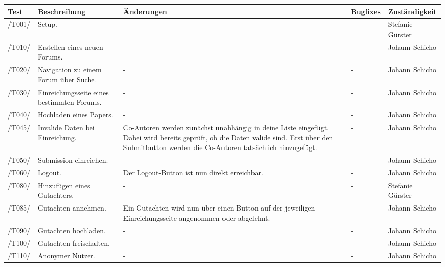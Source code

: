 \begin{table}[H]
	\centering
	\begin{tabular}{m{1.2cm}|m{3cm}|m{3.5cm}|m{3.5cm}|l}
		\toprule
		\textbf{Test} & \textbf{Beschreibung} & \textbf{Änderungen} & \textbf{Bugfixes} & \textbf{Zuständigkeit} \\\midrule
		/T001/ & Setup. & - & - & Stefanie Gürster \\\midrule
		/T010/ & Erstellen eines neuen Forums. & - & - & Johann Schicho \\\midrule
		/T020/ & Navigation zu einem Forum über Suche. & - & - & Johann Schicho \\\midrule
		/T030/ & Einreichungsseite eines bestimmten Forums. & - & - & Johann Schicho \\\midrule
		/T040/ & Hochladen eines Papers. & - & - & Johann Schicho \\\midrule
		/T045/ & Invalide Daten bei Einreichung. & Co-Autoren werden zunächst unabhängig in deine Liste eingefügt. Dabei wird bereits geprüft, ob die Daten valide sind. Erst über den Submitbutton werden die Co-Autoren tatsächlich hinzugefügt. & - & Johann Schicho \\\midrule
		/T050/ & Submission einreichen. & - & - & Johann Schicho \\\midrule
		/T060/ & Logout. & Der Logout-Button ist nun direkt erreichbar. & - & Johann Schicho \\\midrule
		/T080/ & Hinzufügen eines Gutachters. & - & - & Stefanie Gürster \\\midrule
		/T085/ & Gutachten annehmen. & Ein Gutachten wird nun über einen Button auf der jeweiligen Einreichungsseite angenommen oder abgelehnt. & - & Johann Schicho \\\midrule
		/T090/ & Gutachten hochladen. & - & - & Johann Schicho \\\midrule
		/T100/ & Gutachten freischalten. & - & - & Johann Schicho \\\midrule
		/T110/ & Anonymer Nutzer. & - & - & Johann Schicho \\\midrule
		
		
	\end{tabular}
\end{table}

